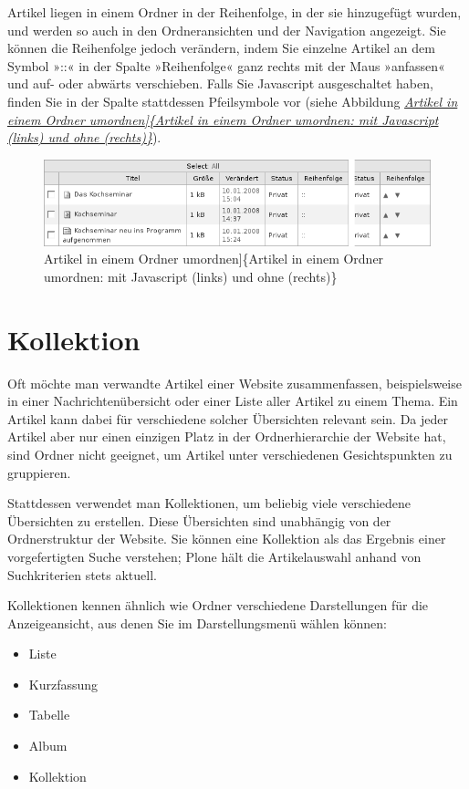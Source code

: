 \documentclass[a4paper,12pt,ngerman]{manual}
\begin{document}
Artikel liegen in einem Ordner in der Reihenfolge, in der sie hinzugefügt
wurden, und werden so auch in den Ordneransichten und der Navigation
angezeigt. Sie können die Reihenfolge jedoch verändern, indem Sie einzelne
Artikel an dem Symbol »::« in der Spalte »Reihenfolge« ganz rechts mit der
Maus »anfassen« und auf- oder abwärts
verschieben. Falls Sie Javascript ausgeschaltet haben, finden Sie in der
Spalte stattdessen Pfeilsymbole vor (siehe Abbildung \hyperlink{fig-umordnen}{\emph{Artikel in einem Ordner umordnen{]}\{Artikel in einem Ordner umordnen:
mit Javascript (links) und ohne (rechts)\}}}).
\hypertarget{fig-umordnen}{}\begin{figure}[htbp]
\centering

\includegraphics{umordnen.png}
\caption{Artikel in einem Ordner umordnen{]}\{Artikel in einem Ordner umordnen:
mit Javascript (links) und ohne (rechts)\}}\end{figure}

\resetcurrentobjects
\hypertarget{--doc-inhaltstypen/thema}{}

\hypertarget{sec-thema}{}\section{Kollektion}

Oft möchte man verwandte Artikel einer Website zusammenfassen, beispielsweise
in einer Nachrichtenübersicht oder einer Liste aller Artikel zu einem
Thema. Ein Artikel kann dabei für verschiedene solcher Übersichten
relevant sein. Da jeder Artikel aber nur einen einzigen Platz in der
Ordnerhierarchie der Website hat, sind Ordner nicht geeignet, um Artikel unter
verschiedenen Gesichtspunkten zu gruppieren.

Stattdessen verwendet man Kollektionen, um beliebig viele verschiedene
Übersichten zu erstellen. Diese Übersichten sind unabhängig von der
Ordnerstruktur der Website. Sie können eine Kollektion als das Ergebnis einer
vorgefertigten Suche verstehen; Plone hält die Artikelauswahl anhand von
Suchkriterien stets aktuell.

Kollektionen kennen ähnlich wie Ordner verschiedene Darstellungen für die
Anzeigeansicht, aus denen Sie im Darstellungsmenü wählen können:
\begin{itemize}
\item {} 
Liste

\item {} 
Kurzfassung

\item {} 
Tabelle

\item {} 
Album

\item {} 
Kollektion

\end{itemize}
\end{document}
